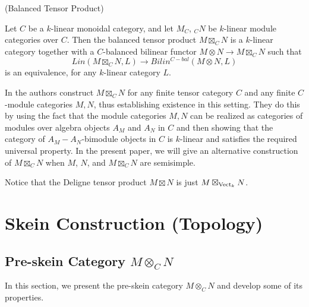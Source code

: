 \begin{definition}\label{definition/balanced-tensor-product} (Balanced Tensor Product)

  \noindent Let $C$ be a $k$-linear monoidal category, and let $M_C$, $_{C}N$
  be $k$-linear module categories over $C$. \quad Then the balanced tensor
  product $M \boxtimes_{C} N$ is a $k$-linear category together with a
  $C$-balanced bilinear functor $M\otimes N\to M\boxtimes_{C} N$ such
  that \[Lin(M \boxtimes_{C} N, L) \to Bilin^{C-bal}(M \otimes N, L)\] is an
  equivalence, for any $k$-linear category $L$.
\end{definition}

In \cite{douglas/balanced-product} the authors construct $M\boxtimes_C N$ for
any finite tensor category $C$ and any finite $C$-module categories $M, N$,
thus establishing existence in this setting. They do this by using the fact
that the module categories $M,N$ can be realized as categories of modules over
algebra objects $A_M$ and $A_N$ in $C$ and then showing that the category of
$A_M-A_N$-bimodule objects in $C$ is $k$-linear and satisfies the required
universal property. In the present paper, we will give an alternative
construction of $M\boxtimes_C N$ when $M$, $N$, and $M \boxtimes_{C} N$ are
semisimple.

\begin{remark} \label{remark/deligne-tensor-product}
  Notice that the Deligne tensor product $M \boxtimes N$ is just
  $M \boxtimes_{\operatorname{Vect}_k} N$.
\end{remark}

\section{Skein Construction (Topology)}\label{section/skein-construction}

\subsection{Pre-skein Category $M\otimes_C N$}

\noindent In this section, we present the pre-skein category $M \otimes_{C} N$
and develop some of its properties.



